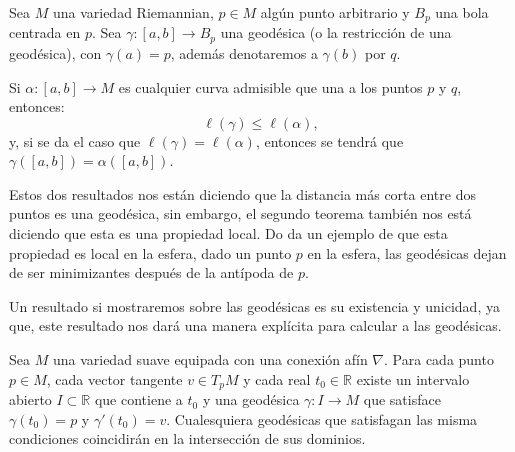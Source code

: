 \begin{theorem}
	Sea $M$ una variedad Riemannian, $p \in M$ algún punto arbitrario y $B_{p}$ una bola centrada en $p$. Sea $\gamma: [a,b] \to B_{p}$ una geodésica (o la restricción de una geodésica), con $\gamma(a) = p$, además denotaremos a $\gamma(b)$ por $q$.

	Si $\alpha: [a,b] \to M$ es cualquier curva admisible que una a los puntos $p$ y $q$, entonces:
	\[
		\ell(\gamma) \leq \ell(\alpha),
	\]
	y, si se da el caso que $\ell(\gamma) = \ell(\alpha)$, entonces se tendrá que $\gamma([a,b]) = \alpha([a,b])$.
\end{theorem}

Estos dos resultados nos están diciendo que la distancia más corta entre dos puntos es una geodésica, sin embargo, el segundo teorema también nos está diciendo que esta es una propiedad local. Do \textcite{do1992riemannian} da un ejemplo de que esta propiedad es local en la esfera, dado un punto $p$ en la esfera, las geodésicas dejan de ser minimizantes después de la antípoda de $p$.

Un resultado si mostraremos sobre las geodésicas es su existencia y unicidad, ya que, este resultado nos dará una manera explícita para calcular a las geodésicas.

\begin{theorem}
	Sea $M$ una variedad suave equipada con una conexión afín $\nabla$. Para cada punto $p \in M$, cada vector tangente $v \in T_{p}M$ y cada real $t_0 \in \mathbb{R}$ existe un intervalo abierto $I \subset \mathbb{R}$ que contiene a $t_0$ y una geodésica $\gamma: I \to M$ que satisface $\gamma(t_0) = p$ y $\gamma'(t_0) = v$. Cualesquiera geodésicas que satisfagan las misma condiciones coincidirán en la intersección de sus dominios.
\end{theorem}

